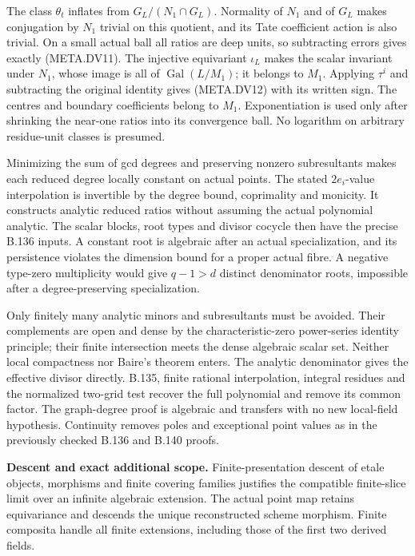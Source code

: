 The class $\theta_t$ inflates from
$G_L/(N_1\cap G_L)$.  Normality of $N_1$
and of $G_L$ makes conjugation by $N_1$
trivial on this quotient, and its Tate
coefficient action is also trivial.
On a small actual ball all ratios are deep
units, so subtracting errors gives exactly
(META.DV11).  The injective equivariant
$\iota_L$ makes the scalar invariant under
$N_1$, whose image is all of
$\operatorname{Gal}(L/M_1)$; it belongs to $M_1$.
Applying $\tau^i$ and subtracting the original
identity gives (META.DV12) with its written
sign.  The centres and boundary coefficients
belong to $M_1$.  Exponentiation is used only
after shrinking the near-one ratios into its
convergence ball.  No logarithm on arbitrary
residue-unit classes is presumed.

Minimizing the sum of gcd degrees and preserving
nonzero subresultants makes each reduced degree
locally constant on actual points.  The stated
$2e_i$-value interpolation is invertible by
the degree bound, coprimality and monicity.
It constructs analytic reduced ratios without
assuming the actual polynomial analytic.
The scalar blocks, root types and divisor
cocycle then have the precise B.136 inputs.
A constant root is algebraic after an actual
specialization, and its persistence violates
the dimension bound for a proper actual fibre.
A negative type-zero multiplicity would give
$q-1>d$ distinct denominator roots, impossible
after a degree-preserving specialization.

Only finitely many analytic minors and
subresultants must be avoided.  Their
complements are open and dense by the
characteristic-zero power-series identity
principle; their finite intersection meets
the dense algebraic scalar set.  Neither
local compactness nor Baire's theorem enters.
The analytic denominator gives the effective
divisor directly.  B.135, finite rational
interpolation, integral residues and the
normalized two-grid test recover the full
polynomial and remove its common factor.
The graph-degree proof is algebraic and
transfers with no new local-field hypothesis.
Continuity removes poles and exceptional
point values as in the previously checked
B.136 and B.140 proofs.

\medskip\noindent\textbf{Descent and exact additional scope.}
Finite-presentation descent of etale objects,
morphisms and finite covering families justifies
the compatible finite-slice limit over an
infinite algebraic extension.  The actual
point map retains equivariance and descends
the unique reconstructed scheme morphism.
Finite composita handle all finite extensions,
including those of the first two derived fields.

